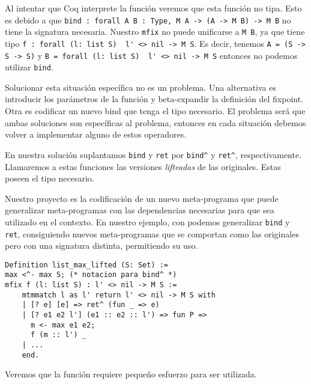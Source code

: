 Al intentar que Coq interprete la función veremos que esta función no tipa.
Esto es debido a que \lstinline{bind : forall A B : Type, M A -> (A -> M B) -> M B} no tiene la signatura necesaria.
Nuestro \lstinline{mfix} no puede unificarse a \lstinline{M B}, ya que tiene
tipo \lstinline{f : forall (l: list S)  l' <> nil -> M S}.
Es decir, tenemos \lstinline{A = (S -> S -> S)} y \lstinline{B = forall (l: list S)  l' <> nil -> M S} entonces no podemos utilizar \lstinline{bind}.

Solucionar esta situación específica no es un problema.
Una alternativa es introducir los parámetros de la función y beta-expandir la definición del fixpoint.
Otra es codificar un nuevo bind que tenga el tipo necesario.
El problema será que ambas soluciones son específicas al problema, entonces en cada situación debemos volver a implementar alguno de estos operadores.

En nuestra solución suplantamos \lstinline{bind} y \lstinline{ret} por \lstinline{bind^} y \lstinline{ret^}, respectivamente. Llamaremos a estas funciones las versiones \emph{lifteadas} de las originales. Estas poseen el tipo necesario.

Nuestro proyecto es la codificación de un nuevo meta-programa \lift que puede generalizar meta-programas con las dependencias necesarias para que sea utilizado en el contexto.
En nuestro ejemplo, con \lift podemos generalizar \lstinline{bind} y \lstinline{ret}, consiguiendo nuevos meta-programas que se comportan como las originales pero con una signatura distinta, permitiendo su uso.

\begin{lstlisting}[frame=tb,caption={Función \lstinline{list_max} lifteada},label=lst:list_max_lifted]
Definition list_max_lifted (S: Set) :=
max <^- max S; (* notacion para bind^ *)
mfix f (l: list S) : l' <> nil -> M S :=
    mtmmatch l as l' return l' <> nil -> M S with
    | [? e] [e] => ret^ (fun _ => e)
    | [? e1 e2 l'] (e1 :: e2 :: l') => fun P =>
      m <- max e1 e2;
      f (m :: l') _
    | ...
    end.
\end{lstlisting}

Veremos que la función \lift requiere pequeño esfuerzo para ser utilizada.